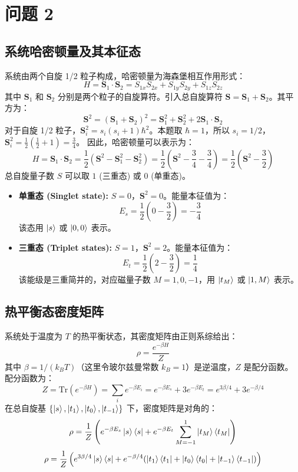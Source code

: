 \documentclass[12pt, a4paper]{article}
\begin{document}
\section*{问题 2}
\subsection*{系统哈密顿量及其本征态}
系统由两个自旋 1/2 粒子构成，哈密顿量为海森堡相互作用形式：
\[ H = \bm{S}_1 \cdot \bm{S}_2 = S_{1x}S_{2x} + S_{1y}S_{2y} + S_{1z}S_{2z} \]
其中 \(\bm{S}_1\) 和 \(\bm{S}_2\) 分别是两个粒子的自旋算符。引入总自旋算符 \(\bm{S} = \bm{S}_1 + \bm{S}_2\)。其平方为：
\[ \bm{S}^2 = (\bm{S}_1 + \bm{S}_2)^2 = \bm{S}_1^2 + \bm{S}_2^2 + 2\bm{S}_1 \cdot \bm{S}_2 \]
对于自旋 1/2 粒子，\(\bm{S}_i^2 = s_i(s_i+1)\hbar^2\)。本题取 \(\hbar = 1\)，所以 \(s_i = 1/2\)，\(\bm{S}_i^2 = \frac{1}{2}(\frac{1}{2}+1) = \frac{3}{4}\)。
因此，哈密顿量可以表示为：
\[ H = \bm{S}_1 \cdot \bm{S}_2 = \frac{1}{2}(\bm{S}^2 - \bm{S}_1^2 - \bm{S}_2^2) = \frac{1}{2}\left(\bm{S}^2 - \frac{3}{4} - \frac{3}{4}\right) = \frac{1}{2}\left(\bm{S}^2 - \frac{3}{2}\right) \]
总自旋量子数 \(S\) 可以取 \(1\) (三重态) 或 \(0\) (单重态)。
\begin{itemize}
    \item \textbf{单重态 (Singlet state):} \(S=0\)，\(\bm{S}^2 = 0\)。能量本征值为：
        \[ E_s = \frac{1}{2}\left(0 - \frac{3}{2}\right) = -\frac{3}{4} \]
        该态用 \(\ket{s}\) 或 \(\ket{0, 0}\) 表示。
    \item \textbf{三重态 (Triplet states):} \(S=1\)，\(\bm{S}^2 = 2\)。能量本征值为：
        \[ E_t = \frac{1}{2}\left(2 - \frac{3}{2}\right) = \frac{1}{4} \]
        该能级是三重简并的，对应磁量子数 \(M = 1, 0, -1\)，用 \(\ket{t_M}\) 或 \(\ket{1, M}\) 表示。
\end{itemize}
\subsection*{热平衡态密度矩阵}
系统处于温度为 \(T\) 的热平衡状态，其密度矩阵由正则系综给出：
\[ \rho = \frac{e^{-\beta H}}{Z} \]
其中 \(\beta = 1/(k_B T)\)（这里令玻尔兹曼常数 \(k_B = 1\)）是逆温度，\(Z\) 是配分函数。
配分函数为：
\[ Z = \text{Tr}(e^{-\beta H}) = \sum_i e^{-\beta E_i} = e^{-\beta E_s} + 3e^{-\beta E_t} = e^{3\beta/4} + 3e^{-\beta/4} \]
在总自旋基 \(\{\ket{s}, \ket{t_1}, \ket{t_0}, \ket{t_{-1}}\}\) 下，密度矩阵是对角的：
\[ \rho = \frac{1}{Z} \left( e^{-\beta E_s} \ket{s}\bra{s} + e^{-\beta E_t} \sum_{M=-1}^{1} \ket{t_M}\bra{t_M} \right) \]
\[ \rho = \frac{1}{Z} \left( e^{3\beta/4} \ket{s}\bra{s} + e^{-\beta/4} (\ket{t_1}\bra{t_1} + \ket{t_0}\bra{t_0} + \ket{t_{-1}}\bra{t_{-1}}) \right) \]
\end{document}
